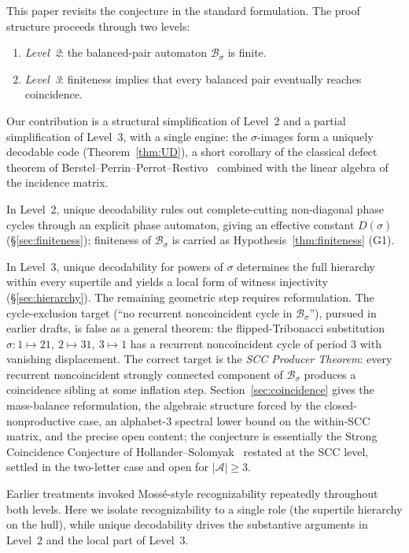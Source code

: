 \documentclass[11pt]{article}
\theoremstyle{plain}
\theoremstyle{definition}
\theoremstyle{remark}
\newcommand{\A}{\mathcal{A}}
\newcommand{\B}{\mathcal{B}}
\begin{document}
This paper revisits the conjecture in the standard formulation. The proof structure proceeds through two levels:
\begin{enumerate}[label=(\arabic*)]
\item \emph{Level~2}: the balanced-pair automaton $\B_\sigma$ is finite.
\item \emph{Level~3}: finiteness implies that every balanced pair eventually reaches coincidence.
\end{enumerate}

Our contribution is a structural simplification of Level~2 and a partial simplification of Level~3, with a single engine: the $\sigma$-images form a uniquely decodable code (Theorem~\ref{thm:UD}), a short corollary of the classical defect theorem of Berstel--Perrin--Perrot--Restivo~\cite{BPPR} combined with the linear algebra of the incidence matrix.

In Level~2, unique decodability rules out complete-cutting non-diagonal phase cycles through an explicit phase automaton, giving an effective constant $D(\sigma)$ (\S\ref{sec:finiteness}); finiteness of $\B_\sigma$ is carried as Hypothesis~\ref{thm:finiteness} (G1).

In Level~3, unique decodability for powers of $\sigma$ determines the full hierarchy within every supertile and yields a local form of witness injectivity (\S\ref{sec:hierarchy}). The remaining geometric step requires reformulation. The cycle-exclusion target (``no recurrent noncoincident cycle in $\B_\sigma$''), pursued in earlier drafts, is false as a general theorem: the flipped-Tribonacci substitution $\sigma:1\mapsto 21,\ 2\mapsto 31,\ 3\mapsto 1$ has a recurrent noncoincident cycle of period 3 with vanishing displacement. The correct target is the \emph{SCC Producer Theorem}: every recurrent noncoincident strongly connected component of $\B_\sigma$ produces a coincidence sibling at some inflation step. Section~\ref{sec:coincidence} gives the mass-balance reformulation, the algebraic structure forced by the closed-nonproductive case, an alphabet-$3$ spectral lower bound on the within-SCC matrix, and the precise open content; the conjecture is essentially the Strong Coincidence Conjecture of Hollander--Solomyak~\cite{HS} restated at the SCC level, settled in the two-letter case and open for $|\A|\ge 3$.

Earlier treatments invoked Moss\'e-style recognizability repeatedly throughout both levels. Here we isolate recognizability to a single role (the supertile hierarchy on the hull), while unique decodability drives the substantive arguments in Level~2 and the local part of Level~3.
\end{document}

